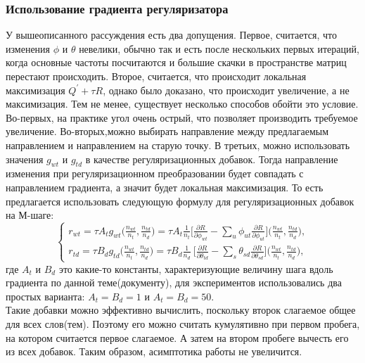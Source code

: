 \documentclass[12pt]{article}
\begin{document}
\subsubsection{Использование градиента регуляризатора}
\label{subsec:gradientuse}
У вышеописанного рассуждения есть два допущения. Первое, считается, что изменения $\phi$ и $\theta$ невелики, обычно так и есть после нескольких первых итераций, когда основные частоты посчитаются и большие скачки в пространстве матриц перестают происходить. Второе, считается, что происходит локальная максимизация $Q^{\prime} + \tau R$, однако было доказано, что происходит увеличение, а не максимизация. Тем не менее, существует несколько способов обойти это условие. Во-первых, на практике угол очень острый, что позволяет производить требуемое увеличение. Во-вторых,можно выбирать направление между предлагаемым направлением и направлением на старую точку. В третьих, можно использовать значения $g_{wt}$ и $g_{td}$ в качестве регуляризационных добавок. Тогда направление изменения при регуляризационном преобразовании будет совпадать с направлением градиента, а значит будет локальная максимизация. То есть предлагается использовать следующую формулу для регуляризационных добавок на М-шаге:
\[
\left\{
	\begin{aligned}
		r_{wt} = \tau A_t g_{wt}\bigg(\frac{n_{wt}}{n_t}, \frac{n_{td}}{n_d}\bigg) = \tau A_t \frac{1}{n_t} \bigg[{\frac{\partial{R}}{\partial{\phi_{wt}}} - \sum\limits_u \phi_{ut} \frac{\partial{R}}{\partial{\phi_{ut}}} }\bigg] \bigg(\frac{n_{wt}}{n_t}, \frac{n_{td}}{n_d}\bigg),\\
		r_{td} = \tau B_d g_{td} \bigg(\frac{n_{wt}}{n_t}, \frac{n_{td}}{n_d}\bigg) = \tau B_d \frac{1}{n_d} \ \bigg[ {\frac{\partial{R}}{\partial{\theta_{td}}} - \sum\limits_s \theta_{sd} \frac{\partial{R}}{\partial{\theta_{sd}}} }\bigg] \bigg(\frac{n_{wt}}{n_t}, \frac{n_{td}}{n_d}\bigg) ,
	\end{aligned}
\right.
\]
где $A_t$ и $B_d$ это какие-то константы, характеризующие величину шага вдоль градиента по данной теме(документу), для экспериментов использовались два простых варианта: $A_t = B_d = 1$ и $A_t=B_d=50$.\\
Такие добавки можно эффективно вычислить, поскольку второк слагаемое общее для всех слов(тем). Поэтому его можно считать кумулятивно при первом пробега, на котором считается первое слагаемое. А затем на втором пробеге вычесть его из всех добавок. Таким образом, асимптотика работы не увеличится. 
\end{document}
